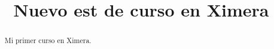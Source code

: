 \documentclass{xourse}
\title{Nuevo est de curso en Ximera}
\begin{document}
  
\begin{abstract} %
Mi primer curso en Ximera.  
\end{abstract}  
\maketitle  
 
 
\end{document}
